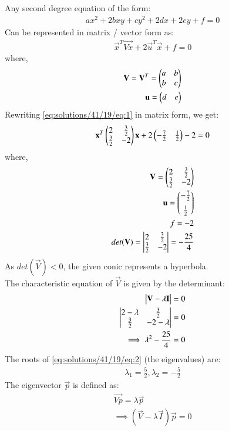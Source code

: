 Any second degree equation of the form:
\begin{align}
  ax^2 + 2bxy + cy^2 + 2dx + 2ey + f = 0
\end{align}
Can be represented in matrix / vector form as:
\begin{align}
  \vec{x}^T\vec{Vx} + 2\vec{u}^T\vec{x} + f = 0
\end{align}
where,
\begin{align}
  \mathbf{V} = \mathbf{V}^T = \begin{pmatrix}a & b \\ b & c\end{pmatrix} \\
  \mathbf{u} = \begin{pmatrix}d & e\end{pmatrix}
\end{align}
Rewriting \eqref{eq:solutions/41/19/eq:1} in matrix form, we get:
\begin{align}
  \mathbf{x}^T\begin{pmatrix}2 & \frac{3}{2} \\\frac{3}{2} & -2\end{pmatrix}\mathbf{x} + 2\begin{pmatrix}-\frac{7}{2} & \frac{1}{2}\end{pmatrix} - 2 = 0
\end{align}
where,
\begin{align}
  \mathbf{V} = \begin{pmatrix}2 & \frac{3}{2} \\\frac{3}{2} & -2\end{pmatrix} \\
  \mathbf{u} = \begin{pmatrix}-\frac{7}{2} \\[0.2cm] \frac{1}{2}\end{pmatrix} \\
  f = -2 \\
  det(\mathbf{V}) = \begin{vmatrix}2 & \frac{3}{2} \\\frac{3}{2} & -2\end{vmatrix} = -\frac{25}{4}
\end{align}
As $det(\vec{V}) < 0$, the given conic represents a hyperbola. \\
The characteristic equation of $\vec{V}$ is given by the determinant:
\begin{align}
  \begin{vmatrix}\mathbf{V} - \lambda\mathbf{I}\end{vmatrix} = 0 \\
  \begin{vmatrix}2 - \lambda & \frac{3}{2} \\\frac{3}{2} & -2 - \lambda\end{vmatrix} = 0 \\
  \implies \lambda^{2} - \frac{25}{4} = 0 \label{eq:solutions/41/19/eq:2}
\end{align}
The roots of \eqref{eq:solutions/41/19/eq:2} (the eigenvalues) are:
\begin{align}
  \lambda_1 = \frac{5}{2}, \lambda_2 = -\frac{5}{2}
\end{align}
The eigenvector $\vec{p}$ is defined as:
\begin{align}
  \vec{Vp} = \lambda \vec{p} \\
  \implies (\vec{V} - \lambda \vec{I})\vec{p} = 0 \label{eq:solutions/41/19/eq:3}
\end{align}
